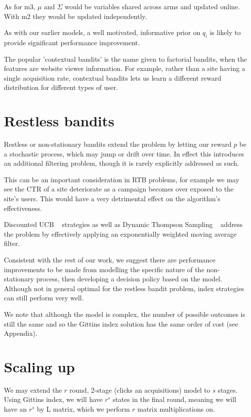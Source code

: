 \documentclass[11pt,a4,singlespacing,titlepagenumber=on]{scrreprt}
\numberwithin{equation}{chapter} %
\theoremstyle{remark}
\begin{document}
As for m3, $\mu$ and $\Sigma$ would be variables shared across arms and updated online. With m2 they would be updated independently.

As with our earlier models, a well motivated, informative prior on $q_i$ is likely to provide significant performance improvement.

The popular 'contextual bandits' is the name given to factorial bandits, when the features are website viewer information. For example, rather than a site having a single acquisition rate, contextual bandits lets us learn a different reward distribution for different types of user.

\section{Restless bandits}

Restless or non-stationary bandits extend the problem by letting our reward $p$ be a stochastic process, which may jump or drift over time. In effect this introduces an additional filtering problem, though it is rarely explicitly addressed as such.

This can be an important consideration in RTB problems, for example we may see the CTR of a site deteriorate as a campaign becomes over exposed to the site's users. This would have a very detrimental effect on the algorithm's effectiveness.

Discounted UCB ~\cite{garivier2008upper} strategies as well as Dynamic Thompson Sampling ~\cite{gupta2011thompson} address the problem by effectively applying an exponentially weighted moving average filter. 

Consistent with the rest of our work, we suggest there are performance improvements to be made from modelling the specific nature of the non-stationary process, then developing a decision policy based on the model. Although not in general optimal for the restless bandit problem, index strategies can still perform very well. 

We note that although the model is complex, the number of possible outcomes is still the same and so the Gittins index solution has the same order of cost (see Appendix).

\section{Scaling up}

We may extend the $r$ round, 2-stage (clicks an acquisitions) model to $s$ stages. Using Gittins index, we will have $r^s$ states in the final round, meaning we will have an $r^s$ by L matrix, which we perform $r$ matrix multiplications on.
\end{document}

